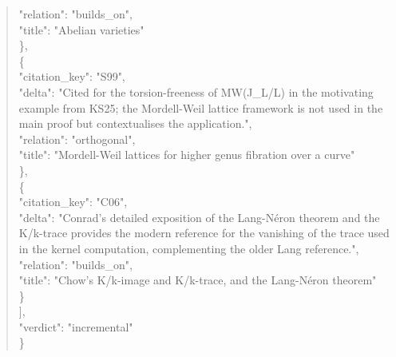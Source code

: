 \documentclass[11pt]{article}
\begin{document}
\begin{quote}
      "relation": "builds\_on",\\
      "title": "Abelian varieties"\\
    \},\\
    \{\\
      "citation\_key": "S99",\\
      "delta": "Cited for the torsion-freeness of MW(J\_L/L) in the motivating example from KS25; the Mordell-Weil lattice framework is not used in the main proof but contextualises the application.",\\
      "relation": "orthogonal",\\
      "title": "Mordell-Weil lattices for higher genus fibration over a curve"\\
    \},\\
    \{\\
      "citation\_key": "C06",\\
      "delta": "Conrad's detailed exposition of the Lang-Néron theorem and the K/k-trace provides the modern reference for the vanishing of the trace used in the kernel computation, complementing the older Lang reference.",\\
      "relation": "builds\_on",\\
      "title": "Chow's K/k-image and K/k-trace, and the Lang-Néron theorem"\\
    \}\\
  ],\\
  "verdict": "incremental"\\
\}\\
\end{quote}
\end{document}
